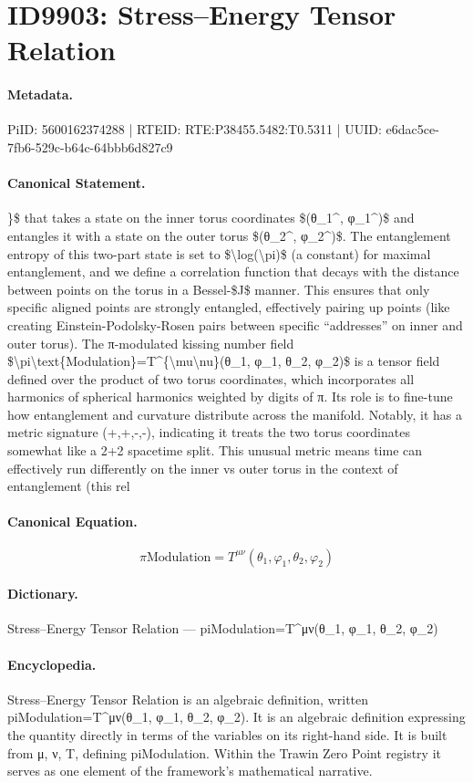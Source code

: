 \section*{ID9903: Stress–Energy Tensor Relation}
\paragraph{Metadata.}
PiID: 5600162374288 | RTEID: RTE:P38455.5482:T0.5311 | UUID: e6dac5ce-7fb6-529c-b64c-64bbb6d827c9

\paragraph{Canonical Statement.}
\}\$ that takes a state on the inner torus coordinates \$(θ\_1\textasciicircum{}, φ\_1\textasciicircum{})\$ and entangles it with a state on the outer torus \$(θ\_2\textasciicircum{}, φ\_2\textasciicircum{})\$. The entanglement entropy of this two-part state is set to \$\textbackslash{}log(\textbackslash{}pi)\$ (a constant) for maximal entanglement, and we define a correlation function that decays with the distance between points on the torus in a Bessel-\$J\$ manner. This ensures that only specific aligned points are strongly entangled, effectively pairing up points (like creating Einstein-Podolsky-Rosen pairs between specific “addresses” on inner and outer torus). The π-modulated kissing number field \$\textbackslash{}pi\textbackslash{}text\{Modulation\}=T\textasciicircum{}\{\textbackslash{}mu\textbackslash{}nu\}(θ\_1, φ\_1, θ\_2, φ\_2)\$ is a tensor field defined over the product of two torus coordinates, which incorporates all harmonics of spherical harmonics weighted by digits of π. Its role is to fine-tune how entanglement and curvature distribute across the manifold. Notably, it has a metric signature (+,+,-,-), indicating it treats the two torus coordinates somewhat like a 2+2 spacetime split. This unusual metric means time can effectively run differently on the inner vs outer torus in the context of entanglement (this rel

\paragraph{Canonical Equation.}
\[
\pi\text{Modulation}=T^{\mu\nu}(θ_1, φ_1, θ_2, φ_2)
\]

\paragraph{Dictionary.}
Stress–Energy Tensor Relation — piModulation=T\textasciicircum{}μν(θ\_1, φ\_1, θ\_2, φ\_2)

\paragraph{Encyclopedia.}
Stress–Energy Tensor Relation is an algebraic definition, written piModulation=T\textasciicircum{}μν(θ\_1, φ\_1, θ\_2, φ\_2). It is an algebraic definition expressing the quantity directly in terms of the variables on its right-hand side. It is built from μ, ν, T, defining piModulation. Within the Trawin Zero Point registry it serves as one element of the framework's mathematical narrative.
